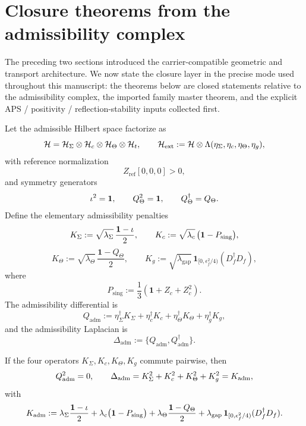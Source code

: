 \section{Closure theorems from the admissibility complex}
\label{sec:closure-theorems}

The preceding two sections introduced the carrier-compatible geometric and transport architecture. We now state the closure layer in the precise mode used throughout this manuscript: the theorems below are closed statements relative to the admissibility complex, the imported family master theorem, and the explicit APS / positivity / reflection-stability inputs collected first.

\begin{definition}
\label{def:admissibility-complex}
Let the admissible Hilbert space factorize as
\[
\mathcal H=\mathcal H_{\Sigma}\otimes\mathcal H_c\otimes\mathcal H_\Theta\otimes\mathcal H_t,
\qquad
\mathcal H_{\mathrm{ext}}
:=
\mathcal H\otimes\Lambda(\eta_\Sigma,\eta_c,\eta_\Theta,\eta_g),
\]
with reference normalization
\[
Z_{\mathrm{ref}}[0,0,0]>0,
\]
and symmetry generators
\[
\iota^2=\mathbf 1,
\qquad
Q_\Theta^2=\mathbf 1,
\qquad
Q_\Theta^\dagger=Q_\Theta.
\]
Define the elementary admissibility penalties
\[
K_\Sigma:=\sqrt{\lambda_\Sigma}\,\frac{\mathbf 1-\iota}{2},
\qquad
K_c:=\sqrt{\lambda_c}\,\bigl(\mathbf 1-P_{\mathrm{sing}}\bigr),
\]
\[
K_\Theta:=\sqrt{\lambda_\Theta}\,\frac{\mathbf 1-Q_\Theta}{2},
\qquad
K_g:=\sqrt{\lambda_{\mathrm{gap}}}\,\mathbf 1_{[0,\epsilon_f^2/4)}(D_f^\dagger D_f),
\]
where
\[
P_{\mathrm{sing}}:=\frac13(\mathbf 1+Z_c+Z_c^2).
\]
The admissibility differential is
\[
Q_{\mathrm{adm}}
:=
\eta_\Sigma^\dagger K_\Sigma
+\eta_c^\dagger K_c
+\eta_\Theta^\dagger K_\Theta
+\eta_g^\dagger K_g,
\]
and the admissibility Laplacian is
\[
\Delta_{\mathrm{adm}}:=\{Q_{\mathrm{adm}},Q_{\mathrm{adm}}^\dagger\}.
\]
\end{definition}

\begin{lemma}
\label{lem:admissibility-nilpotency}
If the four operators $K_\Sigma,K_c,K_\Theta,K_g$ commute pairwise, then
\[
Q_{\mathrm{adm}}^2=0,
\qquad
\Delta_{\mathrm{adm}}
=
K_\Sigma^2+K_c^2+K_\Theta^2+K_g^2
=
K_{\mathrm{adm}},
\]
with
\[
K_{\mathrm{adm}}
:=
\lambda_\Sigma\frac{\mathbf 1-\iota}{2}
+\lambda_c\bigl(\mathbf 1-P_{\mathrm{sing}}\bigr)
+\lambda_\Theta\frac{\mathbf 1-Q_\Theta}{2}
+\lambda_{\mathrm{gap}}\,\mathbf 1_{[0,\epsilon_f^2/4)}(D_f^\dagger D_f).
\]
\end{lemma}

